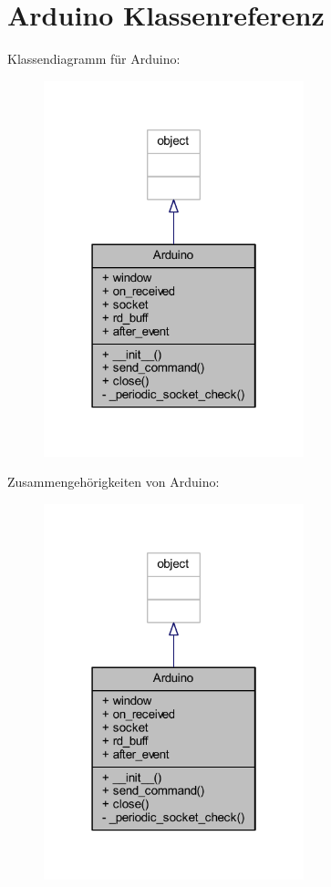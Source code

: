 \hypertarget{class_f_i_n_a_l___g_u_i___w_l_a_n_1_1_arduino}{}\section{Arduino Klassenreferenz}
\label{class_f_i_n_a_l___g_u_i___w_l_a_n_1_1_arduino}


Klassendiagramm für Arduino\+:
\nopagebreak
\begin{figure}[H]
\begin{center}
\leavevmode
\includegraphics[width=214pt]{class_f_i_n_a_l___g_u_i___w_l_a_n_1_1_arduino__inherit__graph}
\end{center}
\end{figure}


Zusammengehörigkeiten von Arduino\+:
\nopagebreak
\begin{figure}[H]
\begin{center}
\leavevmode
\includegraphics[width=214pt]{class_f_i_n_a_l___g_u_i___w_l_a_n_1_1_arduino__coll__graph}
\end{center}
\end{figure}
